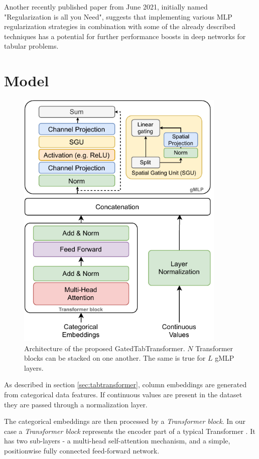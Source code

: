 \documentclass{article}
\begin{document}
Another recently published paper \cite{kadra2021well} from June 2021, initially named "Regularization is all you Need", suggests that implementing various MLP regularization strategies in combination with some of the already described techniques has a potential for further performance boosts in deep networks for tabular problems.

\section{Model}
\label{sec:model}

\begin{figure}[hpt]
  \begin{center}
      \includegraphics[width=10cm]{GatedTabTransformer-architecture.pdf}
  \end{center}
  \caption{Architecture of the proposed GatedTabTransformer. $N$ Transformer blocks can be stacked on one another. The same is true for $L$ gMLP layers.}
  \label{fig:model}
\end{figure}

As described in section \ref{sec:tabtransformer}, column embeddings are generated from categorical data features. If continuous values are present in the dataset they are passed through a normalization layer.

The categorical embeddings are then processed by a \textit{Transformer block}. In our case a \textit{Transformer block} represents the encoder part of a typical Transformer \cite{vaswani2017attention}. It has two sub-layers -  a multi-head self-attention mechanism, and a simple, positionwise fully connected feed-forward network.
\end{document}
